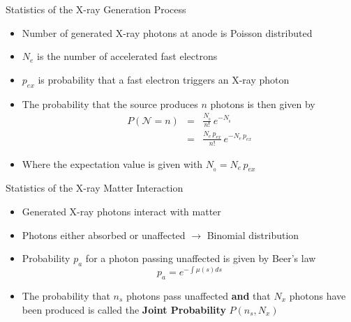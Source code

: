 \begin{frame}{Statistics of the X-ray Generation Process}
    \begin{itemize}
        \item Number of generated X-ray photons at anode is Poisson distributed
        \item $N_e$ is the number of accelerated fast electrons
        \item $p_{ex}$ is probability that a fast electron triggers an X-ray photon
        \item The probability that the source produces $n$ photons is then given by
              \vspace{0.5cm}
              \begin{eqnarray}
                  P(\mathcal{N}=n) &=& \frac{N_{_0}}{n!}\,e^{-N_{_0}}\nonumber\\[0.5cm]
                  &=& \frac{N_e\,p_{ex}}{n!}\,e^{-N_e\,p_{ex}}\nonumber
              \end{eqnarray}
              \vspace{0.01cm}
        \item Where the expectation value is given with $N_{_0}=N_e\,p_{ex}$
    \end{itemize}
\end{frame}

\begin{frame}{Statistics of the X-ray Matter Interaction}
    \begin{itemize}
        \item Generated X-ray photons interact with matter
        \item Photons either absorbed or unaffected $\rightarrow$ Binomial distribution
        \item Probability $p_a$ for a photon passing unaffected is given by Beer's law
              \begin{equation*}
                  p_a = e^{-\int \mu(s) ds}
              \end{equation*}
        \item The probability that $n_s$ photons pass unaffected \textbf{and} that $N_x$ photons have been produced is called the \textbf{Joint Probability} $P(n_s,N_x)$
    \end{itemize}
\end{frame}

